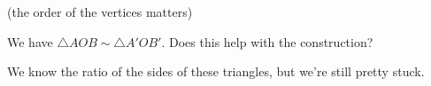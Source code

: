 (the order of the vertices matters)





















We have $\triangle AOB \sim \triangle A'OB'.$ Does this help with the construction?

We know the ratio of the sides of these triangles, but we're still pretty stuck.

